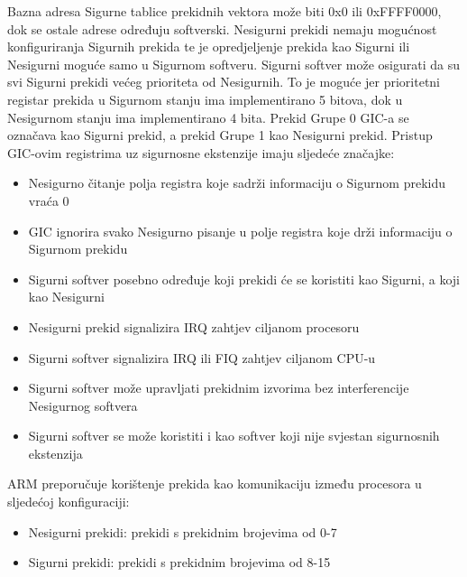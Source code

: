 \documentclass[times, utf8, diplomski, numeric]{fer}
\begin{document}
Bazna adresa Sigurne tablice prekidnih vektora može biti 0x0 ili 0xFFFF0000, dok se ostale adrese određuju softverski.
Nesigurni prekidi nemaju mogućnost konfiguriranja Sigurnih prekida te je opredjeljenje prekida kao Sigurni ili Nesigurni
moguće samo u Sigurnom softveru. Sigurni softver može osigurati da su svi Sigurni prekidi većeg prioriteta od Nesigurnih.
To je moguće jer prioritetni registar prekida u Sigurnom stanju ima implementirano 5 bitova, dok u Nesigurnom stanju ima
implementirano 4 bita.
Prekid Grupe 0 GIC-a se označava kao Sigurni prekid, a prekid Grupe 1 kao Nesigurni prekid. Pristup GIC-ovim registrima uz
sigurnosne ekstenzije imaju sljedeće značajke:
\begin{itemize}
  \item{Nesigurno čitanje polja registra koje sadrži informaciju o Sigurnom prekidu vraća 0}
  \item{GIC ignorira svako Nesigurno pisanje u polje registra koje drži informaciju o Sigurnom prekidu}
  \item{Sigurni softver posebno određuje koji prekidi će se koristiti kao Sigurni, a koji kao Nesigurni}
  \item{Nesigurni prekid signalizira IRQ zahtjev ciljanom procesoru}
  \item{Sigurni softver signalizira IRQ ili FIQ zahtjev ciljanom CPU-u}
  \item{Sigurni softver može upravljati prekidnim izvorima bez interferencije Nesigurnog softvera}
  \item{Sigurni softver se može koristiti i kao softver koji nije svjestan sigurnosnih ekstenzija}
\end{itemize}
ARM preporučuje korištenje prekida kao komunikaciju između procesora u sljedećoj konfiguraciji:
\begin{itemize}
  \item{Nesigurni prekidi: prekidi s prekidnim brojevima od 0-7}
  \item{Sigurni prekidi: prekidi s prekidnim brojevima od 8-15}
\end{itemize}
\end{document}

